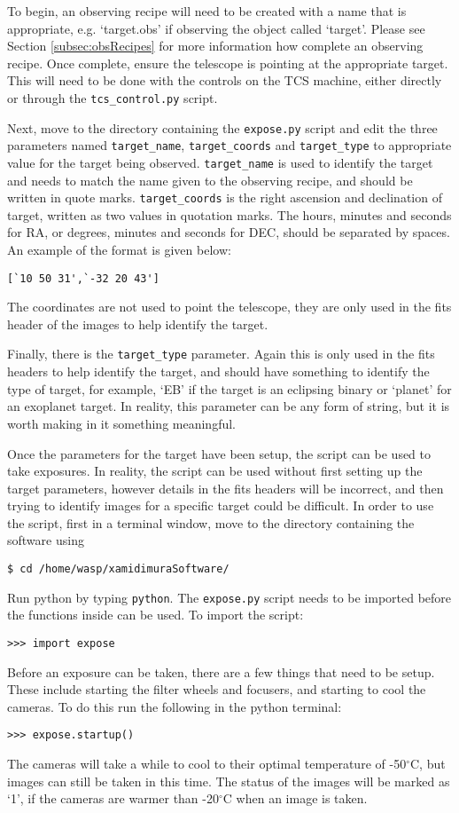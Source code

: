 \documentclass[a4paper,12pt]{article}
\begin{document}
To begin, an observing recipe will need to be created with a name that is appropriate, e.g. `target.obs' if observing the object called `target'. Please see Section \ref{subsec:obsRecipes} for more information how complete an observing recipe. Once complete, ensure the telescope is pointing at the appropriate target. This will need to be done with the controls on the TCS machine, either directly or through the {\tt tcs\_control.py} script.

Next, move to the directory containing the {\tt expose.py} script and edit the three parameters named {\tt target\_name}, {\tt target\_coords} and {\tt target\_type} to appropriate value for the target being observed. {\tt target\_name} is used to identify the target and needs to match the name given to the observing recipe, and should be written in quote marks. {\tt target\_coords} is the right ascension and declination of target, written as two values in quotation marks. The hours, minutes and seconds for RA, or degrees, minutes and seconds for DEC, should be separated by spaces. An example of the format is given below:
\begin{verbatim}
[`10 50 31',`-32 20 43']
\end{verbatim}
The coordinates are not used to point the telescope, they are only used in the fits header of the images to help identify the target.

Finally, there is the {\tt target\_type} parameter.  Again this is only used in the fits headers to help identify the target, and should have something to identify the type of target, for example, `EB' if the target is an eclipsing binary or `planet' for an exoplanet target. In reality, this parameter can be any form of string, but it is worth making in it something meaningful.

Once the parameters for the target have been setup, the script can be used to take exposures. In reality, the script can be used without first setting up the target parameters, however details in the fits headers will be incorrect, and then trying to identify images for a specific target could be difficult. In order to use the script, first in a terminal window, move to the directory containing the software using
\begin{verbatim}
$ cd /home/wasp/xamidimuraSoftware/
\end{verbatim}
Run python by typing {\tt python}. The {\tt expose.py} script needs to be imported before the functions inside can be used. To import the script:
\begin{verbatim}
>>> import expose
\end{verbatim}
Before an exposure can be taken, there are a few things that need to be setup. These include starting the filter wheels and focusers, and starting to cool the cameras. To do this run the following in the python terminal:
\begin{verbatim}
>>> expose.startup()
\end{verbatim}
The cameras will take a while to cool to their optimal temperature of -50$^{\circ}$C, but images can still be taken in this time. The status of the images will be marked as `1', if the cameras are warmer than -20$^{\circ}$C when an image is taken.
\end{document}

